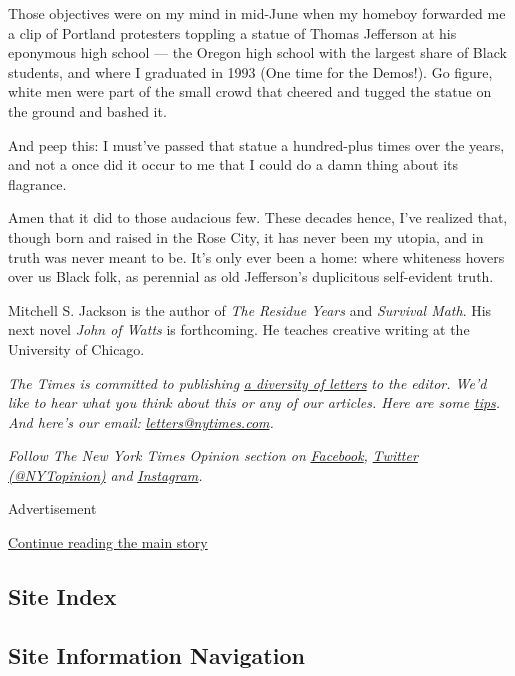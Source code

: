 Those objectives were on my mind in mid-June when my homeboy forwarded
me a clip of Portland protesters toppling a statue of Thomas Jefferson
at his eponymous high school --- the Oregon high school with the largest
share of Black students, and where I graduated in 1993 (One time for the
Demos!). Go figure, white men were part of the small crowd that cheered
and tugged the statue on the ground and bashed it.

And peep this: I must've passed that statue a hundred-plus times over
the years, and not a once did it occur to me that I could do a damn
thing about its flagrance.

Amen that it did to those audacious few. These decades hence, I've
realized that, though born and raised in the Rose City, it has never
been my utopia, and in truth was never meant to be. It's only ever been
a home: where whiteness hovers over us Black folk, as perennial as old
Jefferson's duplicitous self-evident truth.

Mitchell S. Jackson is the author of \emph{The Residue Years} and
\emph{Survival Math}. His next novel \emph{John of Watts} is
forthcoming. He teaches creative writing at the University of Chicago.

\emph{The Times is committed to publishing}
\href{https://www.nytimes.com/2019/01/31/opinion/letters/letters-to-editor-new-york-times-women.html}{\emph{a
diversity of letters}} \emph{to the editor. We'd like to hear what you
think about this or any of our articles. Here are some}
\href{https://help.nytimes.com/hc/en-us/articles/115014925288-How-to-submit-a-letter-to-the-editor}{\emph{tips}}\emph{.
And here's our email:}
\href{mailto:letters@nytimes.com}{\emph{letters@nytimes.com}}\emph{.}

\emph{Follow The New York Times Opinion section on}
\href{https://www.facebook.com/nytopinion}{\emph{Facebook}}\emph{,}
\href{http://twitter.com/NYTOpinion}{\emph{Twitter (@NYTopinion)}}
\emph{and}
\href{https://www.instagram.com/nytopinion/}{\emph{Instagram}}\emph{.}

Advertisement

\protect\hyperlink{after-bottom}{Continue reading the main story}

\hypertarget{site-index}{%
\subsection{Site Index}\label{site-index}}

\hypertarget{site-information-navigation}{%
\subsection{Site Information
Navigation}\label{site-information-navigation}}

